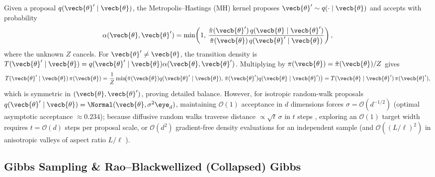 \documentclass[../../../../master.tex]{subfiles}
\begin{document}
\begin{coremath}
Given a proposal $q(\vecb{\theta}' \mid \vecb{\theta})$, the Metropolis--Hastings (MH) kernel proposes $\vecb{\theta}' \sim q(\cdot \mid \vecb{\theta})$ and accepts with probability 
\begin{equation}
  \label{eq:mcmc:mh_accept}
  \alpha(\vecb{\theta}, \vecb{\theta}') = \min\!\left(1,\, \frac{\tilde{\pi}(\vecb{\theta}')\,q(\vecb{\theta} \mid \vecb{\theta}')}{\tilde{\pi}(\vecb{\theta})\,q(\vecb{\theta}' \mid \vecb{\theta})}\right),
\end{equation}
where the unknown $Z$ cancels. For $\vecb{\theta}' \neq \vecb{\theta}$, the transition density is $T(\vecb{\theta}' \mid \vecb{\theta}) = q(\vecb{\theta}' \mid \vecb{\theta})\alpha(\vecb{\theta}, \vecb{\theta}')$. Multiplying by $\pi(\vecb{\theta}) = \tilde{\pi}(\vecb{\theta})/Z$ gives
\begin{equation}
  \label{eq:mcmc:mh_db_proof}
  T(\vecb{\theta}' \mid \vecb{\theta})\,\pi(\vecb{\theta})
  = \frac{1}{Z}\min\!\bigl(\tilde{\pi}(\vecb{\theta})q(\vecb{\theta}' \mid \vecb{\theta}),\, \tilde{\pi}(\vecb{\theta}')q(\vecb{\theta} \mid \vecb{\theta}')\bigr)
  = T(\vecb{\theta} \mid \vecb{\theta}')\,\pi(\vecb{\theta}'),
\end{equation}
which is symmetric in $(\vecb{\theta}, \vecb{\theta}')$, proving detailed balance. However, for isotropic random-walk proposals $q(\vecb{\theta}' \mid \vecb{\theta}) = \Normal(\vecb{\theta}, \sigma^2 \eye_d)$, maintaining $\mathcal{O}(1)$ acceptance in $d$ dimensions forces $\sigma = \mathcal{O}(d^{-1/2})$ (optimal asymptotic acceptance $\approx 0.234$); because diffusive random walks traverse distance $\propto \sqrt{t}\,\sigma$ in $t$ steps , exploring an $\mathcal{O}(1)$ target width requires $t = \mathcal{O}(d)$ steps per proposal scale, or $\mathcal{O}(d^2)$ gradient-free density evaluations for an independent sample (and $\mathcal{O}((L/\ell)^2)$ in anisotropic valleys of aspect ratio $L/\ell$ ).
\end{coremath}

\subsection{Gibbs Sampling \& Rao--Blackwellized (Collapsed) Gibbs}
\label{subsec:mcmc:gibbs}
\end{document}
